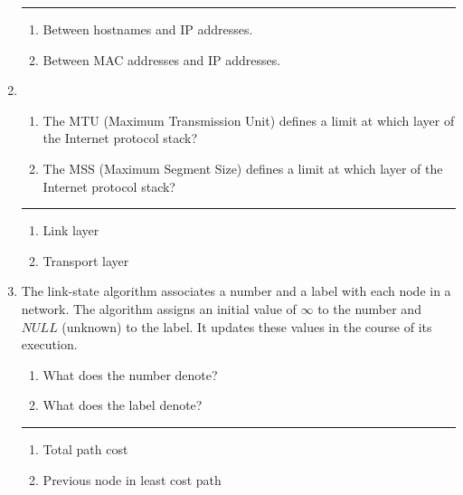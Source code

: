 \documentclass[twoside]{article}
\newenvironment{answer}
  {\vspace*{0.2cm} \rule{12cm}{0.04cm} \vspace*{0.2cm}}
  {\vspace*{0.2cm}}
\begin{document}
\begin{enumerate}
  \begin{answer}

  \begin{enumerate}
    \item Between hostnames and IP addresses.
    \item Between MAC addresses and IP addresses.
    \end{enumerate}

    \end{answer}

  \item 
  \begin{enumerate}
    \item The MTU (Maximum Transmission Unit) defines a limit at which
      layer of the Internet protocol stack?
    \item The MSS (Maximum Segment Size) defines a limit at which
      layer of the Internet protocol stack?
    \end{enumerate}

  \begin{answer}

  \begin{enumerate}
    \item Link layer
    \item Transport layer
    \end{enumerate}

    \end{answer}

  \item The link-state algorithm associates a number and a label with
    each node in a network. The algorithm assigns an initial value
    of $\infty$ to the number and $NULL$ (unknown) to the label.
    It updates these values in the course of its execution.
  \begin{enumerate}
    \item What does the number denote?
    \item What does the label denote?
    \end{enumerate}
  
  \begin{answer}

  \begin{enumerate}
    \item Total path cost
    \item Previous node in least cost path
    \end{enumerate}

    \end{answer}


\end{enumerate}
\end{document}
